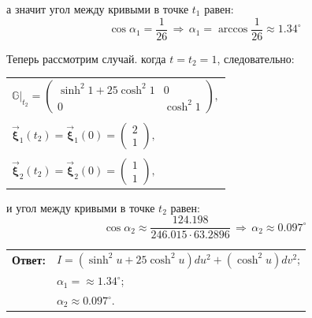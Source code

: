 \documentclass[12pt,a4paper]{article}
\newcommand{\boldVec}[1]{\vec{\mathbf #1}}
\newcommand{\scalarProduct}[2]{(\boldVec #1, \boldVec #2)}
\begin{document}
    \noindent а значит угол между кривыми в точке $ t_1 $ равен:
    \[
        \cos \alpha_1 = \frac{1}{26}
        \,\Rightarrow\,
        \alpha_1 = \arccos{\frac{1}{26}} \approx 1.34^{\circ}
    \]

    Теперь рассмотрим случай. когда $ t = t_2 = 1 $, следовательно:
    \begin{table}[h]
        \centering
        \begin{tabular}{l}
            $ \mathbb{G}|_{t_2} = 
                \begin{pmatrix}
                    \sinh^2 1 + 25 \cosh^2 1 & 0
                    \\
                    0                        & \cosh^2 1
                \end{pmatrix}\! ,
            $
            \\ \\
            $ \boldVec \xi_1(t_2) = \boldVec \xi_1(0) = 
                \begin{pmatrix}
                    2
                    \\
                    1
                \end{pmatrix}\! ,
            $ 
            \\ \\
            $ \boldVec \xi_2(t_2) = \boldVec \xi_2(0) = 
                \begin{pmatrix}
                    1
                    \\
                    1
                \end{pmatrix}\! ,
            $ 
        \end{tabular}
    \end{table}

    \noindent и угол между кривыми в точке $ t_2 $ равен:
    \[
        \cos \alpha_2 \approx \frac{124.198}{246.015 \cdot 63.2896}
        \,\Rightarrow\,
        \alpha_2 \approx 0.097^{\circ}
    \]

    \begin{flushright}
        \begin{tabular}{rl}
            \textbf{Ответ:} & $ I = (\sinh^2 u + 25 \cosh^2 u)du^2 + (\cosh^2 u) dv^2 $;

            \\

                            & $ \alpha_1 = \approx 1.34^{\circ} $;

            \\

                            & $ \alpha_2 \approx 0.097^{\circ} $.
        \end{tabular}
    \end{flushright}


\end{document}
